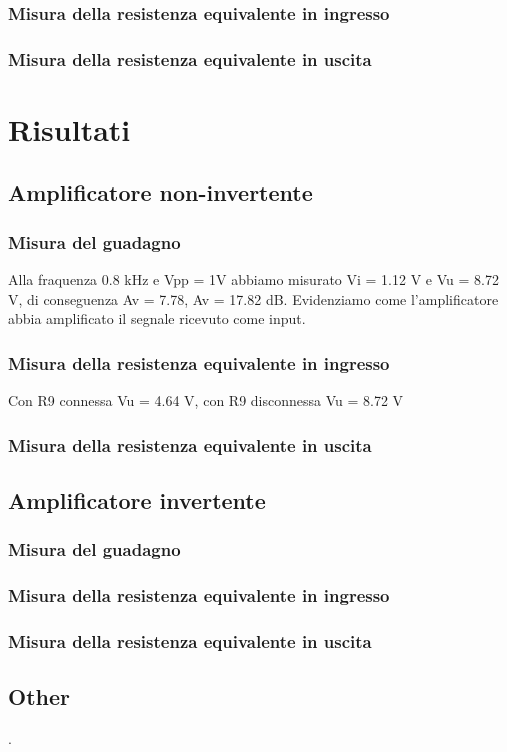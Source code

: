 \documentclass[a4paper]{article}
\begin{document}
			\subsubsection{Misura della resistenza equivalente in ingresso}	
			
			\subsubsection{Misura della resistenza equivalente in uscita}	
	\section{Risultati}
		\subsection{Amplificatore non-invertente}
			\subsubsection{Misura del guadagno}
				Alla fraquenza 0.8 kHz e Vpp = 1V abbiamo misurato Vi = 1.12 V e Vu = 8.72 V, di conseguenza Av = 7.78, Av = 17.82 dB. 
				Evidenziamo come l'amplificatore abbia amplificato il segnale ricevuto come input.
			\subsubsection{Misura della resistenza equivalente in ingresso}	
				Con R9 connessa Vu = 4.64 V, con R9 disconnessa Vu = 8.72 V
			\subsubsection{Misura della resistenza equivalente in uscita}
			
		\subsection{Amplificatore invertente}
			\subsubsection{Misura del guadagno}
		
			\subsubsection{Misura della resistenza equivalente in ingresso}	
			\subsubsection{Misura della resistenza equivalente in uscita}	
	
		\subsection{Other}
			.
\end{document}

